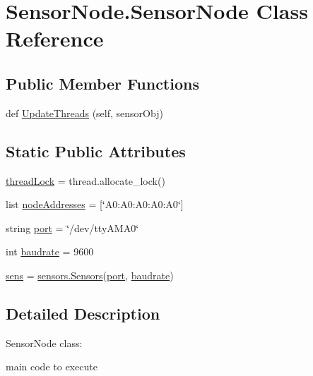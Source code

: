 \hypertarget{classSensorNode_1_1SensorNode}{}\section{Sensor\+Node.\+Sensor\+Node Class Reference}
\label{classSensorNode_1_1SensorNode}
\subsection*{Public Member Functions}
\begin{DoxyCompactItemize}
\item 
def \hyperlink{classSensorNode_1_1SensorNode_ad1e6d287c777ea31608f7b81e0023c60}{Update\+Threads} (self, sensor\+Obj)
\end{DoxyCompactItemize}
\subsection*{Static Public Attributes}
\begin{DoxyCompactItemize}
\item 
\hyperlink{classSensorNode_1_1SensorNode_a6453b42daae16cdc043bea6825374162}{thread\+Lock} = thread.\+allocate\+\_\+lock()
\item 
list \hyperlink{classSensorNode_1_1SensorNode_a17be4a277b9bfdd041ec006b462d497c}{node\+Addresses} = \mbox{[}\char`\"{}A0\+:\+A0\+:\+A0\+:\+A0\+:\+A0\char`\"{}\mbox{]}
\item 
string \hyperlink{classSensorNode_1_1SensorNode_a94712cd1b0bf09fa4cd3de94ca666575}{port} = \char`\"{}/dev/tty\+A\+M\+A0\char`\"{}
\item 
int \hyperlink{classSensorNode_1_1SensorNode_a68f7a87f1d03a2734f3f6505f801a92e}{baudrate} = 9600
\item 
\hyperlink{classSensorNode_1_1SensorNode_ad8aec254c15c97a8b5c709480f31b2bb}{sens} = \hyperlink{classsensors_1_1Sensors}{sensors.\+Sensors}(\hyperlink{classSensorNode_1_1SensorNode_a94712cd1b0bf09fa4cd3de94ca666575}{port}, \hyperlink{classSensorNode_1_1SensorNode_a68f7a87f1d03a2734f3f6505f801a92e}{baudrate})
\end{DoxyCompactItemize}


\subsection{Detailed Description}
\begin{DoxyVerb}SensorNode class:

    main code to execute\end{DoxyVerb}
 

